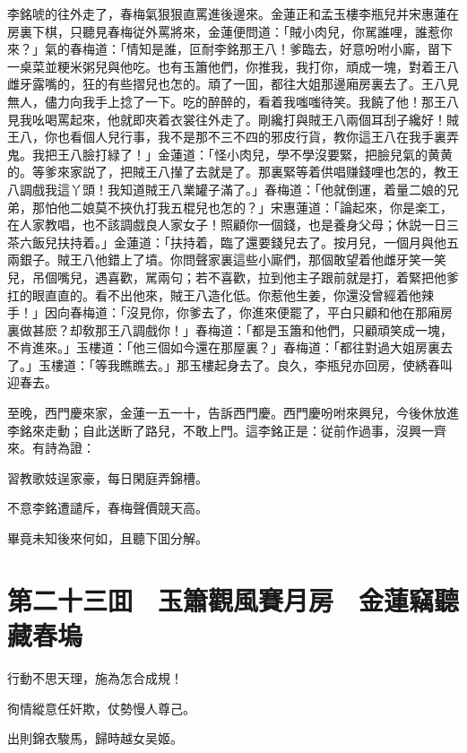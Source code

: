 李銘唬的往外走了，春梅氣狠狠直罵進後邊來。金蓮正和孟玉樓李瓶兒并宋惠蓮在房裏下棋，只聽見春梅従外罵將來，金蓮便問道：「賊小肉兒，你駡誰哩，誰惹你來？」氣的春梅道：「情知是誰，叵耐李銘那王八！爹臨去，好意吩咐小廝，㽞下一桌菜並粳米粥兒與他吃。也有玉簫他們，你推我，我打你，頑成一塊，對着王八雌牙露嘴的，狂的有些摺兒也怎的。頑了一囬，都往大姐那邊廂房裏去了。王八見無人，儘力向我手上捻了一下。吃的醉醉的，看着我嗤嗤待笑。我饒了他！那王八見我吆喝罵起來，他就即夾着衣裳往外走了。剛纔打與賊王八兩個耳刮子纔好！賊王八，你也看個人兒行事，我不是那不三不四的邪皮行貨，教你這王八在我手裏弄鬼。我把王八臉打緑了！」金蓮道：「怪小肉兒，學不學沒要緊，把臉兒氣的黄黄的。等爹來家説了，把賊王八攆了去就是了。那裏緊等着供唱赚錢哩也怎的，教王八調戲我這丫頭！我知道賊王八業罐子滿了。」春梅道：「他就倒運，着量二娘的兄弟，那怕他二娘莫不挾仇打我五棍兒也怎的？」宋惠蓮道：「論起來，你是楽工，在人家教唱，也不該調戲良人家女子！照顧你一個錢，也是養身父母；休説一日三茶六飯兒扶持着。」金蓮道：「扶持着，臨了還要錢兒去了。按月兒，一個月與他五兩銀子。賊王八他錯上了墳。你問聲家裏這些小廝們，那個敢望着他雌牙笑一笑兒，吊個嘴兒，遇喜歡，駡兩句；若不喜歡，拉到他主子跟前就是打，着緊把他爹扛的眼直直的。看不出他來，賊王八造化低。你惹他生姜，你還没曾經着他辣手！」因向春梅道：「沒見你，你爹去了，你進來便罷了，平白只顧和他在那廂房裏做甚麽？却敎那王八調戲你！」春梅道：「都是玉簫和他們，只顧頑笑成一塊，不肯進來。」玉樓道：「他三個如今還在那屋裏？」春梅道：「都往對過大姐房裏去了。」玉樓道：「等我瞧瞧去。」那玉樓起身去了。良久，李瓶兒亦回房，使綉春叫迎春去。

至晚，西門慶來家，金蓮一五一十，告訴西門慶。西門慶吩咐來興兒，今後休放進李銘來走動；自此送断了路兒，不敢上門。這李銘正是：従前作過事，沒興一齊來。有詩為證：

習教歌妓逞家豪，每日閑庭弄錦槽。

不意李銘遭譴斥，春梅聲價競天高。

畢竟未知後來何如，且聽下囬分解。

\chapter*{第二十三囬　玉簫觀風賽月房　金蓮竊聽藏春塢}

行動不思天理，施為怎合成規！

徇情縱意任奸欺，仗勢慢人尊己。

出則錦衣駿馬，歸時越女吴姬。

